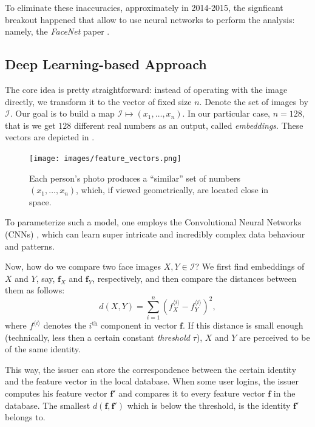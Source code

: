 \documentclass[a4, 14pt]{extarticle}
\begin{document}
To eliminate these inaccuracies, approximately in 2014-2015, the signficant breakout happened that allow to use neural networks to perform the analysis: namely, the \textit{FaceNet} paper \cite{Schroff_2015}.

\subsection{Deep Learning-based Approach}\label{ai:deep}

The core idea is pretty straightforward: instead of operating with the image directly, we transform it to the vector of fixed size $n$. Denote the set of images by $\mathcal{I}$. Our goal is to build a map $\mathcal{I} \mapsto (x_1,\dots,x_n)$. In our particular case, $n=128$, that is we get $128$ different real numbers as an output, called \textit{embeddings}. These vectors are depicted in .

\begin{figure}
    \centering
    \texttt{[image: images/feature\_vectors.png]}
    \caption{Each person's photo produces a ``similar'' set of numbers $(x_1,\dots,x_n)$, which, if viewed geometrically, are located close in space.}
    \label{fig:sphere}
\end{figure}

To parameterize such a model, one employs the Convolutional Neural Networks (CNNs) \cite{oshea2015introduction}, which can learn super intricate and incredibly complex data behaviour and patterns. 

Now, how do we compare two face images $X,Y \in \mathcal{I}$? We first find embeddings of $X$ and $Y$, say, $\boldsymbol{f}_X$ and $\boldsymbol{f}_Y$, respectively, and then compare the distances between them as follows:
\begin{equation}
    d(X,Y) = \sum_{i=1}^n (f_X^{\langle i \rangle} - f_Y^{\langle i \rangle})^2,
\end{equation}
where $f^{\langle i \rangle}$ denotes the $i^{\text{th}}$ component in vector $\boldsymbol{f}$. If this distance is small enough (technically, less then a certain constant \textit{threshold} $\tau$), $X$ and $Y$ are perceived to be of the same identity.

This way, the issuer can store the correspondence between the certain identity and the feature vector in the local database. When some user logins, the issuer computes his feature vector $\boldsymbol{f}'$ and compares it to every feature vector $\boldsymbol{f}$ in the database. The smallest $d(\boldsymbol{f},\boldsymbol{f}')$ which is below the threshold, is the identity $\boldsymbol{f}'$ belongs to. 
\end{document}

